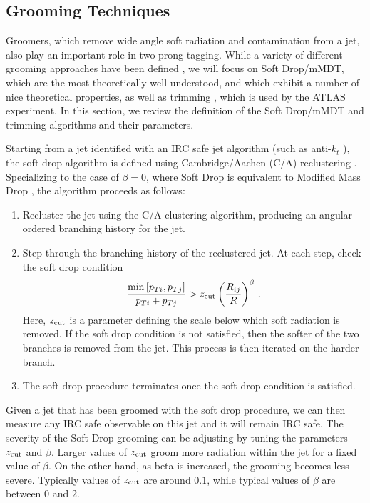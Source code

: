\documentclass[11pt,letterpaper]{article}
\newcommand{\zcut}{z_{\rm cut}}
\begin{document}
\subsection{Grooming Techniques}\label{sec:groom_tech}

Groomers, which remove wide angle soft radiation and contamination from a jet, also play an important role in two-prong tagging. While a variety of different grooming approaches have been defined \cite{Butterworth:2008iy,Ellis:2009su,Ellis:2009me,Krohn:2009th,Dasgupta:2013via,Dasgupta:2013ihk}, we will focus on Soft Drop/mMDT, which are the most theoretically well understood, and which exhibit a number of nice theoretical properties, as well as trimming \cite{Krohn:2009th}, which is used by the ATLAS experiment. In this section, we review the definition of the Soft Drop/mMDT and trimming algorithms and their parameters.

Starting from a jet identified with an IRC safe jet algorithm (such as anti-$k_t$ \cite{Cacciari:2008gp}), the soft drop algorithm is defined using Cambridge/Aachen (C/A) reclustering \cite{Dokshitzer:1997in,Wobisch:1998wt,Wobisch:2000dk}.  Specializing to the case of $\beta=0$, where Soft Drop is equivalent to Modified Mass Drop \cite{Dasgupta:2013ihk}, the algorithm proceeds as follows:
\begin{enumerate}

\item Recluster the jet using the C/A clustering algorithm, producing an angular-ordered branching history for the jet.

\item Step through the branching history of the reclustered jet.  At each step, check the soft drop condition
\begin{align}\label{eq:sd_cut}
\frac{\min\left[ p_{Ti}, p_{Tj}  \right]}{p_{Ti}+p_{Tj}}> \zcut \left(   \frac{R_{ij}}{R}\right)^\beta \,.
\end{align}
Here, $\zcut$ is a parameter defining the scale below which soft radiation is removed.  If the soft drop condition is not satisfied, then the softer of the two branches is removed from the jet.  This process is then iterated on the harder branch.

\item The soft drop procedure terminates once the soft drop condition is satisfied.

\end{enumerate}
Given a jet that has been groomed with the soft drop procedure, we can then measure any IRC safe observable on this jet and it will remain IRC safe. The severity of the Soft Drop grooming can be adjusting by tuning the parameters $\zcut$ and $\beta$. Larger values of $\zcut$ groom more radiation within the jet for a fixed value of $\beta$. On the other hand, as beta is increased, the grooming becomes less severe. Typically values of $\zcut$ are around $0.1$, while typical values of $\beta$ are between $0$ and $2$.
\end{document}
